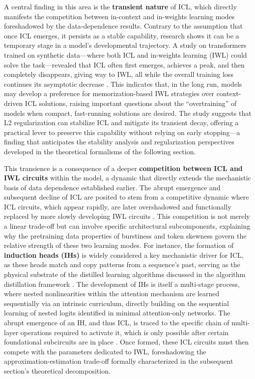 \documentclass[11pt]{article}
\begin{document}
A central finding in this area is the \textbf{transient nature} of ICL, which directly manifests the competition between in-context and in-weights learning modes foreshadowed by the data-dependence results. Contrary to the assumption that once ICL emerges, it persists as a stable capability, research shows it can be a temporary stage in a model's developmental trajectory. A study on transformers trained on synthetic data---where both ICL and in-weights learning (IWL) could solve the task---revealed that ICL often first emerges, achieves a peak, and then completely disappears, giving way to IWL, all while the overall training loss continues its asymptotic decrease \cite{ref73}. This indicates that, in the long run, models may develop a preference for memorization-based IWL strategies over context-driven ICL solutions, raising important questions about the ``overtraining'' of models when compact, fast-running solutions are desired. The study suggests that L2 regularization can stabilize ICL and mitigate its transient decay, offering a practical lever to preserve this capability without relying on early stopping---a finding that anticipates the stability analysis and regularization perspectives developed in the theoretical formalisms of the following section.

This transience is a consequence of a deeper \textbf{competition between ICL and IWL circuits} within the model, a dynamic that directly extends the mechanistic basis of data dependence established earlier. The abrupt emergence and subsequent decline of ICL are posited to stem from a competitive dynamic where ICL circuits, which appear rapidly, are later overshadowed and functionally replaced by more slowly developing IWL circuits \cite{ref55}. This competition is not merely a linear trade-off but can involve specific architectural subcomponents, explaining why the pretraining data properties of burstiness and token skewness govern the relative strength of these two learning modes. For instance, the formation of \textbf{induction heads (IHs)} is widely considered a key mechanistic driver for ICL, as these heads match and copy patterns from a sequence's past, serving as the physical substrate of the distilled learning algorithms discussed in the algorithm distillation framework \cite{ref56}. The development of IHs is itself a multi-stage process, where nested nonlinearities within the attention mechanism are learned sequentially via an intrinsic curriculum, directly building on the sequential learning of nested logits identified in minimal attention-only networks. The abrupt emergence of an IH, and thus ICL, is traced to the specific chain of multi-layer operations required to activate it, which is only possible after certain foundational subcircuits are in place \cite{ref55}. Once formed, these ICL circuits must then compete with the parameters dedicated to IWL, foreshadowing the approximation-estimation trade-off formally characterized in the subsequent section's theoretical decomposition.
\end{document}

